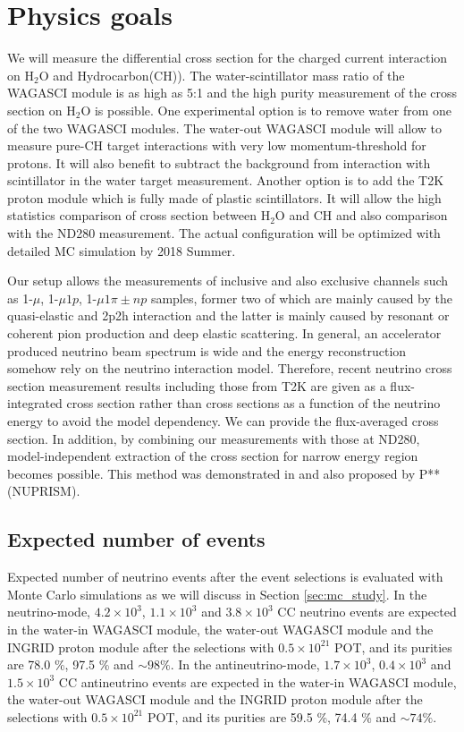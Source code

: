 \section{Physics goals}
We will measure the differential cross section for the charged current interaction on $\mathrm{H_2O}$ and Hydrocarbon(CH)).
The water-scintillator mass ratio of the WAGASCI module is as high as 5:1 and the high purity measurement
of the cross section on $\mathrm{H_2O}$ is possible.
One experimental option is to remove water from one of the two WAGASCI modules. 
The water-out WAGASCI module will allow to measure pure-CH target interactions with very low momentum-threshold for protons.
It will also benefit to subtract the background from interaction with scintillator in the water target measurement.
Another option is to add the T2K proton module which is fully made of plastic scintillators.
It will allow the high statistics comparison of cross section between $\mathrm{H_2O}$ and CH and also comparison
with the ND280 measurement. The actual configuration will be optimized with detailed MC simulation by 2018 Summer.

Our setup allows the measurements of inclusive and also exclusive channels such as
1-$\mu$, 1-$\mu 1p$, 1-$\mu 1\pi{\pm} np$ samples, former two of which are mainly caused by the quasi-elastic and
2p2h interaction and the latter is mainly caused by resonant or coherent pion production and deep elastic scattering.
In general, an accelerator produced neutrino beam spectrum is wide and the energy reconstruction
somehow rely on the neutrino interaction model.
Therefore, recent neutrino cross section measurement results including those from T2K are given
as a flux-integrated cross section rather than cross sections as a function of the neutrino energy to avoid the model dependency.
We can provide the flux-averaged cross section.
In addition, by combining our measurements with those at ND280, model-independent extraction of the cross section
for narrow energy region becomes possible.
This method was demonstrated in \cite{Abe:2015biq} and also proposed by P** (NUPRISM).

\subsection{Expected number of events}
Expected number of neutrino events after the event selections is evaluated with Monte Carlo simulations as we will discuss in Section \ref{sec:mc_study}.
In the neutrino-mode, $4.2 \times 10^{3}$, $1.1 \times 10^{3}$ and $3.8 \times 10^{3}$ CC neutrino events are expected in the water-in WAGASCI module, the water-out WAGASCI module and the INGRID proton module after the selections with $0.5\times 10^{21}$ POT, and its purities are 78.0 \%, 97.5 \% and $\sim 98 \%$.
In the antineutrino-mode, $1.7 \times 10^{3}$, $0.4 \times 10^{3}$ and $1.5 \times 10^{3}$ CC antineutrino events are expected in the water-in WAGASCI module, the water-out WAGASCI module and the INGRID proton module after the selections with $0.5\times 10^{21}$ POT, and its purities are 59.5 \%, 74.4 \% and $\sim 74 \%$.


